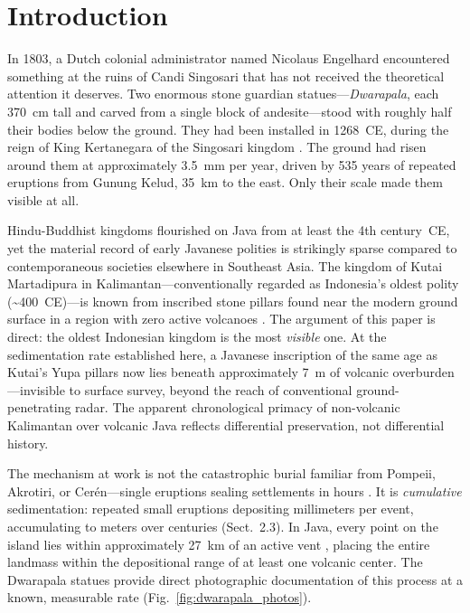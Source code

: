 \documentclass[12pt,a4paper]{article}
\begin{document}
\begin{abstract}
\medskip
\noindent\textbf{Keywords:} volcanic taphonomy; sedimentation rates; archaeological visibility; East Java; multi-site calibration; survey bias
\end{abstract}


\section{Introduction}

In 1803, a Dutch colonial administrator named Nicolaus Engelhard encountered something at the ruins of Candi Singosari that has not received the theoretical attention it deserves. Two enormous stone guardian statues---\textit{Dwarapala}, each 370~cm tall and carved from a single block of andesite---stood with roughly half their bodies below the ground. They had been installed in 1268~CE, during the reign of King Kertanegara of the Singosari kingdom \citep{kinney2003}. The ground had risen around them at approximately 3.5~mm per year, driven by 535 years of repeated eruptions from Gunung Kelud, 35~km to the east. Only their scale made them visible at all.

Hindu-Buddhist kingdoms flourished on Java from at least the 4th century~CE, yet the material record of early Javanese polities is strikingly sparse compared to contemporaneous societies elsewhere in Southeast Asia. The kingdom of Kutai Martadipura in Kalimantan---conventionally regarded as Indonesia's oldest polity (\textasciitilde400~CE)---is known from inscribed stone pillars found near the modern ground surface in a region with zero active volcanoes \citep{vogel1918,coedes1968}. The argument of this paper is direct: the oldest Indonesian kingdom is the most \textit{visible} one. At the sedimentation rate established here, a Javanese inscription of the same age as Kutai's Yupa pillars now lies beneath approximately 7~m of volcanic overburden---invisible to surface survey, beyond the reach of conventional ground-penetrating radar. The apparent chronological primacy of non-volcanic Kalimantan over volcanic Java reflects differential preservation, not differential history.

The mechanism at work is not the catastrophic burial familiar from Pompeii, Akrotiri, or Cer\'{e}n---single eruptions sealing settlements in hours \citep{sigurdsson1985,doumas1983,sheets1992}. It is \textit{cumulative} sedimentation: repeated small eruptions depositing millimeters per event, accumulating to meters over centuries (Sect.~2.3). In Java, every point on the island lies within approximately 27~km of an active vent \citep{vanbemmelen1949}, placing the entire landmass within the depositional range of at least one volcanic center. The Dwarapala statues provide direct photographic documentation of this process at a known, measurable rate (Fig.~\ref{fig:dwarapala_photos}).
\end{document}
